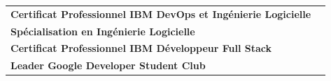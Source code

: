 \renewcommand{\arraystretch}{1.1}

\begin{tabular}{l l}
    \textbf{Certificat Professionnel IBM DevOps et Ingénierie Logicielle}  \\

    \textbf{Spécialisation en Ingénierie Logicielle} \\
    \textbf{Certificat Professionnel IBM Développeur Full Stack} \\
    \textbf{Leader Google Developer Student Club}
\end{tabular}
